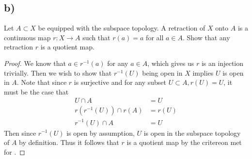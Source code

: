 \documentclass{article}
\theoremstyle{definition}
\begin{document}
\subsection*{b)}
\begin{mdframed}
    Let $A \subset X$ be equipped with the subspace topology.
    A retraction of $X$ onto $A$ is a continuous map $r: X \rightarrow A$ such that $r(a) = a$ for all
    $a \in A$. Show that any retraction $r$ is a quotient map.
\end{mdframed}
\begin{proof}
    We know that $a \in r^{-1}(a)$ for any $a \in A$, which gives us $r$ is an injection trivially.
    Then we wish to show that $r^{-1}(U)$ being open in $X$ implies $U$ is open in $A$. Note that since $r$ is surjective and for any subset $U \subset A, r(U) = U$, it must be the case that 
    \begin{align*}
        U \cap A &= U \\
        r(r^{-1}(U)) \cap r(A) &= r(U) \\
        r^{-1}(U) \cap A &= U
    \end{align*}
    Then since $r^{-1}(U)$ is open by assumption, $U$ is open in the subspace topology of $A$ by definition. Thus it follows that $r$ is a quotient map by the critereon met for 
    .
\end{proof}
\end{document}
